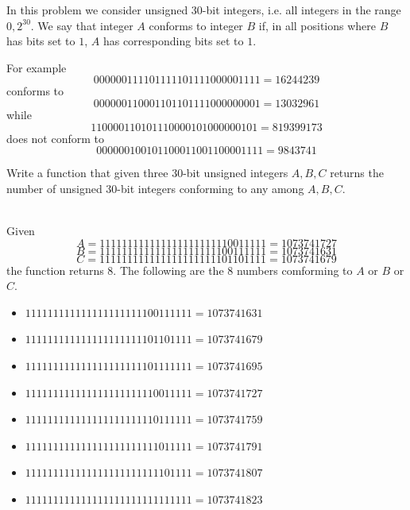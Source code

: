 \begin{exercise}
\label{example:count_numbers_conforming_bitmask:exercice1}
In this problem we consider unsigned 30-bit integers, i.e. all integers in the range $0,2^{30}$.
We say that integer $A$ conforms to integer $B$ if, in all positions where $B$ has bits set to $1$, $A$ has corresponding bits set to $1$.

For example $$00 0000 1111 0111 1101 1110 0000 1111 = 16244239$$ conforms to $$00 0000 1100 0110 1101 1110 0000 0001 = 13032961$$ while $$11 0000 1101 0111 0000 1010 0000 0101 = 819399173$$ does not conform to $$00 0000 1001 0110 0011 0011 0000 1111 =9843741$$

Write a function that given three 30-bit unsigned integers $A,B,C$ returns the number of unsigned 30-bit integers conforming to any among $A,B,C$.

    \begin{example}
        \label{example:count_numbers_conforming_bitmask:example1}
        \hfill \\
        Given $$A = 11 1111 1111 1111 1111 1111 1001 1111 = 1073741727$$
        $$B = 11 1111 1111 1111 1111 1111 0011 1111 = 1073741631$$
        $$C = 11 1111 1111 1111 1111 1111 0110 1111 = 1073741679$$
        the function returns $8$. The following are the $8$ numbers comforming to $A$ or $B$ or $C$.
        \begin{itemize}
            \item  $11 1111 1111 1111 1111 1111 0011 1111 = 1073741631$
            \item  $11 1111 1111 1111 1111 1111 0110 1111 = 1073741679$
            \item  $11 1111 1111 1111 1111 1111 0111 1111 = 1073741695$
            \item  $11 1111 1111 1111 1111 1111 1001 1111 = 1073741727$
            \item  $11 1111 1111 1111 1111 1111 1011 1111 = 1073741759$
            \item  $11 1111 1111 1111 1111 1111 1101 1111 = 1073741791$
            \item  $11 1111 1111 1111 1111 1111 1110 1111 = 1073741807$
            \item  $11 1111 1111 1111 1111 1111 1111 1111 = 1073741823$
        \end{itemize}

    \end{example}

\end{exercise}



